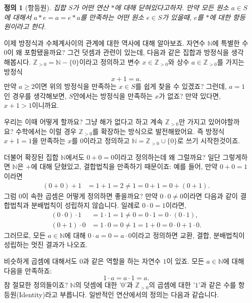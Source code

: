 \documentclass[a4paper, 11pt]{report}
\renewcommand{\<}{\langle}
\renewcommand{\>}{\rangle}
\newtheorem{dfn}[thm]{정의}
\begin{document}
\begin{dfn}[항등원] 집합 $S$가 어떤 연산 $*$에 대해 닫혀있다고하자. 만약 모든 원소 $a \in S$에 대해서
  $a*e = a = e*a$를 만족하는 어떤 원소 $e \in S$가 있을때, $e$를 $*$에 대한 항등원이라고 한다.
\end{dfn}

\iffalse
이제 방정식과 수체계사이의 관계에 대한 역사에 대해 알아보죠. 자연수 $\mathbb{N}$에 특별한 수 $0$이 왜 
포함됐을까요? 그건 덧셈과 관련이 있는데, 다음과 같은 집합과 방정식을 생각해봅시다. $\mathbb{Z}_{>0} = \mathbb{N} - \{0\}$이라고
정의하고 변수 $x \in \mathbb{Z}_{>0}$와 상수 $a \in \mathbb{Z}_{>0}$를 가지는 방정식
$$
x + 1 = a.
$$
만약 $a \ge 2$이면 위의 방정식을 만족하는 $x \in S$를 쉽게 찾을 수 있겠죠? 그런데, $a = 1$인 경우를 생각해보면,
$S$안에서는 방정식을 만족하는 $x$가 없죠? 만약 있다면, $x + 1 > 1$이니까요. 

우리는 이때 어떻게 할까요? 그냥 해가 없다고 하고 계속 $\mathbb{Z}_{>0}$만 가지고 있어야할까요? 
수학에서는 이럴 경우 $\mathbb{Z}_{>0}$를 확장하는 방식으로 발전해왔어요. 즉 방정식 
$x + 1 = 1$을 만족하는 $x$를 $0$이라고 정의하고 $\mathbb{N} = \mathbb{Z}_{>0} \cup \{0\}$로 쓰기 
시작한것이죠. 


더불어 확장된 집합 $\mathbb{N}$에서도  $0 + 0 = 0$이라고 정의하는데 왜 그럴까요? 일단 그렇게하면 $\mathbb{N}$은 $+$에 대해 닫혔있고, 
결합법칙을 만족하기 때문이죠: 예를 들어, 만약 $0 + 0 = 1$이라면
\begin{align*}
    (0 + 0) + 1 &= 1 + 1 = 2 \neq 1 = 0 + 1 = 0 + (0 + 1).
\end{align*}
그럼 $0$이 속한 곱셈은 어떻게 정의하면 좋을까요? 만약 $0\cdot 0 \neq 0$이라면 다음과 같이 
결합법칙과 분배법칙이 성립하지 않습니다. 일례로 $0 \cdot 0 = 1$이라면,
\begin{align*}
  (0 \cdot 0) \cdot 1 &= 1 \cdot 1 = 1 \neq 0 = 0 \cdot 1 = 0 \cdot (0 \cdot 1),\\
  (0 + 1) \cdot 0 &= 1 \cdot 0 = 0 \neq 1 = 1 + 0 = 0 \cdot 0 + 1 \cdot 0.
\end{align*}
그러므로, 모든 $a \in \mathbb{N}$에 대해 $0\cdot a = 0 = a \cdot 0$이라고 정의하면 교환, 결합, 분배법칙이
성립하는 멋진 결과가 나오죠.

비슷하게 곱셈에 대해서도 $0$과 같은 역할을 하는 자연수 $1$이 있죠. 모든 $a \in \mathbb{N}$에 대해 다음을
만족하죠:
$$
1\cdot a = a \cdot 1 = a.
$$
참 절묘한 정의들이죠? $\mathbb{N}$의 덧셈에 대한 '$0$'과 $\mathbb{Z}_{>0}$의 
곱셈에 대한 '$1$'과 같은 수를 항등원(Identity)라고 부릅니다. 일반적인 연산에서의 정의는 다음과 같습니다.
\end{document}
